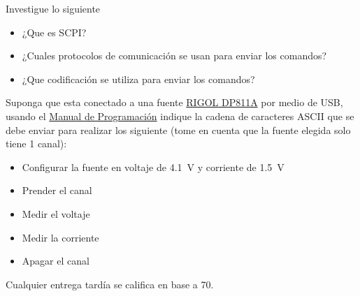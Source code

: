 \documentclass[12pt]{article}
\begin{document}
\setlength{\parindent}{0em}

Investigue lo siguiente

\begin{itemize}
    \item ¿Que es SCPI?
    \item ¿Cuales protocolos de comunicación se usan para enviar los comandos?
    \item ¿Que codificación se utiliza para enviar los comandos?
\end{itemize}

Suponga que esta conectado a una fuente \href{https://www.rigol-uk.co.uk/jg/wp-content/uploads/2021/08/Rigol-DP800-Power-Supply-Manual.pdf}{RIGOL DP811A} por medio de USB, usando el \href{https://www.batronix.com/pdf/Rigol/ProgrammingGuide/DP800_ProgrammingGuide_EN.pdf}{Manual de Programación} indique la cadena de caracteres ASCII que se debe enviar para realizar los siguiente (tome en cuenta que la fuente elegida solo tiene 1 canal):
\begin{itemize}
    \item Configurar la fuente en voltaje de \SI{4.1}{\volt} y corriente de \SI{1.5}{\volt}
    \item Prender el canal
    \item Medir el voltaje
    \item Medir la corriente
    \item Apagar el canal
\end{itemize}

Cualquier entrega tardía se califica en base a 70. 


% 
% 
\end{document}
